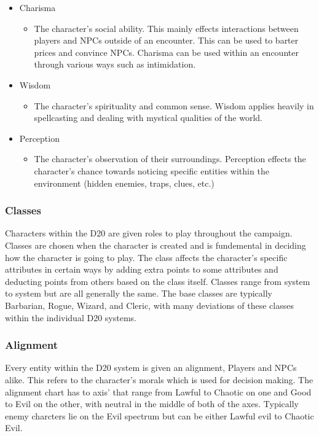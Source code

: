 \documentclass[12pt,a4paper]{report}
\begin{document}
\begin{itemize}
\begin{itemize}
					\end{itemize}
				\item Charisma
					\begin{itemize}
						\item The character's social ability. This mainly effects interactions between players and NPCs outside of an encounter. This can be used to barter prices and convince NPCs. Charisma can be used within an encounter through various ways such as intimidation. 
					\end{itemize}
				\item Wisdom
					\begin{itemize}
						\item The character's spirituality and common sense. Wisdom applies heavily in spellcasting and dealing with mystical qualities of the world. 
					\end{itemize}
				\item Perception
					\begin{itemize}
						\item The character's observation of their surroundings. Perception effects the character's chance towards noticing specific entities within the environment (hidden enemies, traps, clues, etc.)
					\end{itemize}
			\end{itemize}
			\subsubsection{Classes}
				Characters within the D20 are given roles to play throughout the campaign. Classes are chosen when the character is created and is fundemental in deciding how the character is going to play. The class affects the character's specific attributes in certain ways by adding extra points to some attributes and deducting points from others based on the class itself. Classes range from system to system but are all generally the same. The base classes are typically Barbarian, Rogue, Wizard, and Cleric, with many deviations of these classes within the individual D20 systems.
			\subsubsection{Alignment}
				Every entity within the D20 system is given an alignment, Players and NPCs alike. This refers to the character's morals which is used for decision making. The alignment chart has to axis' that range from Lawful to Chaotic on one and Good to Evil on the other, with neutral in the middle of both of the axes. Typically enemy charcters lie on the Evil spectrum but can be either Lawful evil to Chaotic Evil. 
\end{document}
